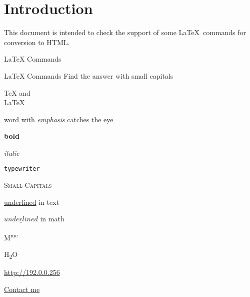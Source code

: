 \documentclass{article}
\begin{document}
\section*{Introduction}

This document is intended to check the support of some \LaTeX\ commands for 
conversion to HTML.

\begin{quiz}[points=1]{LaTeX Commands}
\begin{multi}{LaTeX Commands}
Find the answer with small capitals
\item \TeX{} and\\\relax \LaTeX%
\item word with \emph{emphasis} catches the eye
\item \textbf{bold}
\item \textit{italic}
\item \texttt{typewriter}
\item* \textsc{Small Capitals}
\item \underline{underlined} in text
\item $\underline{underlined}$ in math
\item M\textsuperscript{me}
\item H\textsubscript{2}O
\item \url{http://192.0.0.256}
\item \href{mailto:name@server.com}{Contact me}
\end{multi}

\end{quiz}
\end{document}
